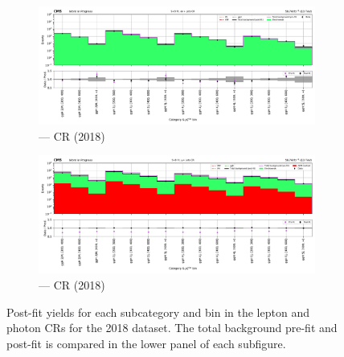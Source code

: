 \begin{figure}[htbp]
    \begin{subfigure}[b]{0.66\textwidth}
        \includegraphics[width=\textwidth]{chapters/higgstoinv/figures/mountain_ranges/2018/ggF/Zee_tree_fit_s-abs_values_ggF_cats.pdf}
        \caption{\ggH --- \doubleEleCr \gls{CR} (2018)}
    \end{subfigure}

    \begin{subfigure}[b]{0.66\textwidth}
        \includegraphics[width=\textwidth]{chapters/higgstoinv/figures/mountain_ranges/2018/ggF/Photon_tree_fit_s-abs_values_ggF_cats.pdf}
        \caption{\ggH --- \singlePhotonCr \gls{CR} (2018)}
    \end{subfigure}
    \caption[Post-fit yields for each \ggH subcategory and \ptmiss bin in the lepton and photon control regions for the 2018 dataset]{Post-fit yields for each \ggH subcategory and \ptmiss bin in the lepton and photon \glspl{CR} for the 2018 dataset. The total background pre-fit and post-fit is compared in the lower panel of each subfigure.}
    \label{fig:htoinv_mountain_range_ggF_2018_CRs}
\end{figure}
